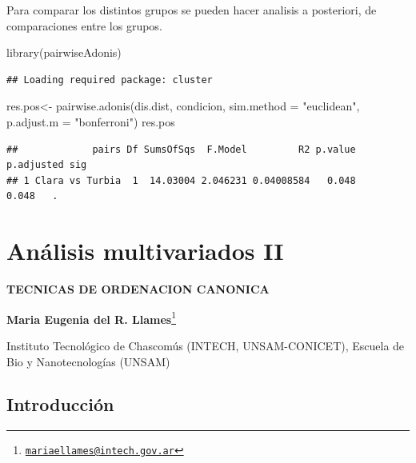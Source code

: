 \documentclass[
]{book}
\newenvironment{Shaded}{\begin{snugshade}}{\end{snugshade}}
\newcommand{\AttributeTok}[1]{\textcolor[rgb]{0.77,0.63,0.00}{#1}}
\newcommand{\FunctionTok}[1]{\textcolor[rgb]{0.00,0.00,0.00}{#1}}
\newcommand{\NormalTok}[1]{#1}
\newcommand{\OtherTok}[1]{\textcolor[rgb]{0.56,0.35,0.01}{#1}}
\newcommand{\StringTok}[1]{\textcolor[rgb]{0.31,0.60,0.02}{#1}}
\begin{document}
Para comparar los distintos grupos se pueden hacer analisis a posteriori, de comparaciones entre los grupos.

\begin{Shaded}
\begin{Highlighting}[]
\FunctionTok{library}\NormalTok{(pairwiseAdonis)}
\end{Highlighting}
\end{Shaded}

\begin{verbatim}
## Loading required package: cluster
\end{verbatim}

\begin{Shaded}
\begin{Highlighting}[]
\NormalTok{res.pos}\OtherTok{\textless{}{-}} \FunctionTok{pairwise.adonis}\NormalTok{(dis.dist, condicion, }\AttributeTok{sim.method =} \StringTok{"euclidean"}\NormalTok{, }\AttributeTok{p.adjust.m =} \StringTok{"bonferroni"}\NormalTok{)}
\NormalTok{res.pos}
\end{Highlighting}
\end{Shaded}

\begin{verbatim}
##             pairs Df SumsOfSqs  F.Model         R2 p.value p.adjusted sig
## 1 Clara vs Turbia  1  14.03004 2.046231 0.04008584   0.048      0.048   .
\end{verbatim}

\hypertarget{multi2}{%
\chapter{Análisis multivariados II}\label{multi2}}

\textbf{TECNICAS DE ORDENACION CANONICA}

\textbf{Maria Eugenia del R. Llames}\footnote{\href{mailto:mariaellames@intech.gov.ar}{\nolinkurl{mariaellames@intech.gov.ar}}}

Instituto Tecnológico de Chascomús (INTECH, UNSAM-CONICET), Escuela de Bio y Nanotecnologías (UNSAM)

\hypertarget{introducciuxf3n-1}{%
\section{Introducción}\label{introducciuxf3n-1}}
\end{document}
